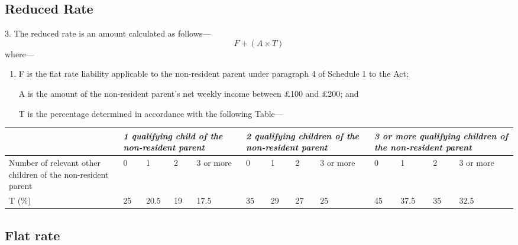 \documentclass[12pt,a4paper]{article}
\begin{document}
\subsection[3. Reduced Rate]{Reduced Rate}

3.  The reduced rate is an amount calculated as follows—
\[F + (A \times T)\]
where—
\begin{enumerate}\item[]
    F is the flat rate liability applicable to the non-resident parent under paragraph 4 of Schedule 1 to the Act;

    A is the amount of the non-resident parent’s net weekly income between £100 and £200; and

    T is the percentage determined in accordance with the following Table— 
\end{enumerate}

{\scriptsize\noindent{}
\begin{tabular}{p{96pt}p{8pt}p{14pt}p{8pt}p{18pt}p{8pt}p{8pt}p{8pt}p{18pt}p{8pt}p{14pt}p{8pt}p{18pt}}
\hline
&	\multicolumn{4}{p{84pt}}{\itshape 1 qualifying child of the non-resident parent}	& \multicolumn{4}{p{78pt}}{\itshape 2 qualifying children of the non-resident parent}	& \multicolumn{4}{p{84pt}}{\itshape 3 or more qualifying children of the non-resident parent}\\
\hline
Number of relevant other children of the non-resident parent	&0	&1	&2	&3 or more	&0	&1	&2	&3 or more	&0	&1	&2	&3 or more\\
\hline
T (\%)	&25	&20$.$5	&19	&17$.$5	&35	&29	&27	&25	&45	&37$.$5	&35	&32$.$5\\
\hline
\end{tabular}

}

\subsection[4. Flat rate]{Flat rate}
\end{document}
